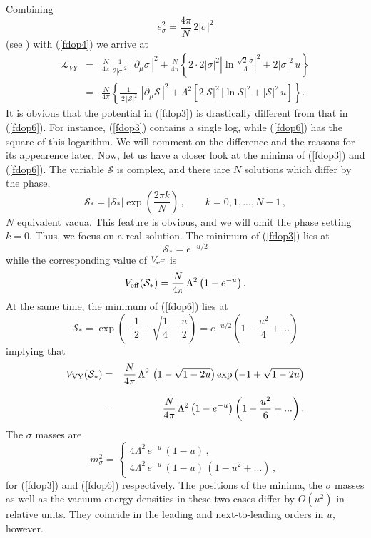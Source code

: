 \documentclass[epsfig,12pt]{article}
\def\beq{\begin{equation}}
\def\eeq{\end{equation}}
\def\beqn{\begin{eqnarray}}
\def\eeqn{\end{eqnarray}}
\newcommand{\cs}{{\mathcal S}}
\def\beqn{\begin{eqnarray}}
\def\eeqn{\end{eqnarray}}
\def\beq{\begin{equation}}
\def\eeq{\end{equation}}
\begin{document}
{Combining 
\beq
e^2_\sigma =\frac{4\pi}{N}\,2|\sigma|^2
\label{fdop5} 
\eeq
(see \cite{SYhet}) with (\ref{fdop4}) we arrive at
\beqn
{\mathcal L}_{VY} 
&=&\frac{N}{4\pi}\,\frac{1}{2|\sigma|^2}\,| \,  \partial_\mu\sigma \,|^2+
 \frac{N}{4\pi}
\left\{ 2\cdot 2|\sigma|^2
 \left|
\ln\frac{\sqrt{2}\, \sigma}{\Lambda}\right|^2
+2|\sigma|^2\, u\right\}
\nonumber\\[3mm]
&=& \frac{N}{4\pi}
\left\{
\frac{1}{\,2\, |\cs|^2}\,\,
 | \partial_\mu\cs \, |^2
 +\Lambda^2
 \left[2|\cs |^2\,\left|\ln \cs\right|^2 + |\cs|^2\,u
 \right]
 \right\}.
 \label{fdop6}
\eeqn
It is obvious that the potential in (\ref{fdop3})
is drastically different from that in (\ref{fdop6}). 
For instance, (\ref{fdop3}) contains a single log, while (\ref{fdop6}) has the square of this logarithm.
We will comment on the difference and the reasons for its appearence \cite{DADA}
later. Now, let us have a closer look at the minima of
(\ref{fdop3}) and (\ref{fdop6}). The variable $\cs$ is complex, and there iare $N$ solutions
which differ by the phase,
\beq
\cs_* = \left|\cs_* \right|\exp\left(\frac{2\pi k}{N}\right)\,,\qquad k = 0,1, ..., N-1\,,
\eeq
$N$ equivalent vacua. This feature is obvious, and we will omit the phase setting $k=0$.
Thus, we focus on a real solution.
The minimum of (\ref{fdop3}) lies at
 \beq
 \cs_* = e^{-u/2}
 \label{wdop1}
 \eeq
while the corresponding value of $V_{\rm eff}$ is
\beq
V_{\rm eff} (\cs_* ) = \frac{N}{4\pi}\,\Lambda^2 \left(1- e^{-u}
\right)  .
 \label{wdop2}
\eeq
At the same time, the minimum of (\ref{fdop6}) lies at
\beq
\cs_* = \exp\left(-\frac{1}{2} + \sqrt{\frac{1}{4}-\frac{u}{2}}\right) =  e^{-u/2}\left(1-\frac{u^2}{4} + ...
\right)
\label{wdop3}
\eeq
implying that 
\beqn
V_{\rm VY} (\cs_* )
&=&  \frac{N}{4\pi}\,\Lambda^2 \,\left({1} - \sqrt{{1}-2 {u}} \right)\exp\left(-{1} + \sqrt{{1}-2 {u}}\right)
\nonumber\\[3mm]
& =&
  \frac{N}{4\pi}\,\Lambda^2 \left(1- e^{-u}
\right) \left(1-\frac{u^2}{6}  + ...
\right) .
\label{wdop4}
\eeqn 
The $\sigma$ masses are
\beq
m_\sigma^2 = \left\{
\begin{array}{l}
4\Lambda^2\,e^{-u}\,(1-u)\,,\\[2mm]
4\Lambda^2\,e^{-u}\,(1-u)\,(1-u^2+...)\,,
\end{array}
\right.
\label{wdop4}
\eeq
for (\ref{fdop3}) and (\ref{fdop6}) respectively.
The positions of the minima, the $\sigma$ masses
as well as the vacuum energy densities in these two cases
differ by $O(u^2)$ in relative units. They coincide in the leading and next-to-leading orders in $u$, however.

}
\end{document}
